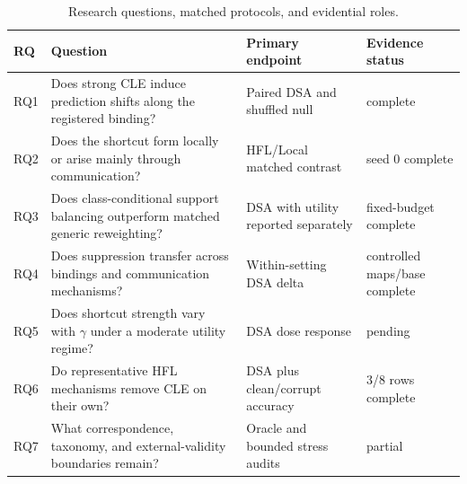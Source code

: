 \begin{table}[t]
\centering
\small
\caption{Research questions, matched protocols, and evidential roles.}
\label{tab:research-questions}
\begin{tabularx}{\textwidth}{lXll}
\toprule
RQ & Question & Primary endpoint & Evidence status \\
\midrule
RQ1 & Does strong CLE induce prediction shifts along the registered binding? & Paired DSA and shuffled null & complete \\
RQ2 & Does the shortcut form locally or arise mainly through communication? & HFL/Local matched contrast & seed 0 complete \\
RQ3 & Does class-conditional support balancing outperform matched generic reweighting? & DSA with utility reported separately & fixed-budget complete \\
RQ4 & Does suppression transfer across bindings and communication mechanisms? & Within-setting DSA delta & controlled maps/base complete \\
RQ5 & Does shortcut strength vary with \(\gamma\) under a moderate utility regime? & DSA dose response & pending \\
RQ6 & Do representative HFL mechanisms remove CLE on their own? & DSA plus clean/corrupt accuracy & 3/8 rows complete \\
RQ7 & What correspondence, taxonomy, and external-validity boundaries remain? & Oracle and bounded stress audits & partial \\
\bottomrule
\end{tabularx}
\end{table}
